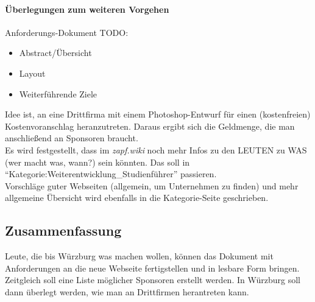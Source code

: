    \paragraph{Überlegungen zum weiteren Vorgehen}
      Anforderungs-Dokument TODO:
      \begin{itemize}
        \item Abstract/Übersicht
        \item Layout
        \item Weiterführende Ziele
      \end{itemize}

      Idee ist, an eine Drittfirma mit einem Photoshop-Entwurf für einen (kostenfreien) Kostenvoranschlag heranzutreten.
      Daraus ergibt sich die Geldmenge, die man anschließend an Sponsoren braucht. \\

      Es wird festgestellt, dass im \textit{zapf.wiki} noch mehr Infos zu den LEUTEN zu WAS (wer macht was, wann?) sein könnten. Das soll in ``Kategorie:Weiterentwicklung\_Studienführer'' passieren. \\

      Vorschläge guter Webseiten (allgemein, um Unternehmen zu finden) und mehr allgemeine Übersicht wird ebenfalls in die Kategorie-Seite geschrieben.

  \subsection*{Zusammenfassung}
    Leute, die bis Würzburg was machen wollen, können das Dokument mit Anforderungen an die neue Webseite fertigstellen und in lesbare Form bringen.
    Zeitgleich soll eine Liste möglicher Sponsoren erstellt werden. In Würzburg soll dann überlegt werden, wie man an Drittfirmen herantreten kann.
